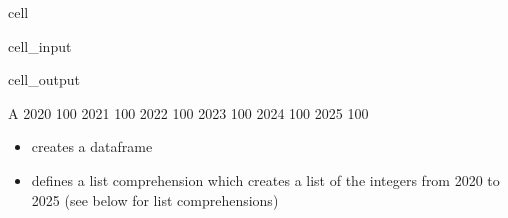 \documentclass[letterpaper,10pt,english]{jupyterBook}
\begin{document}
\begin{sphinxuseclass}{cell}\begin{sphinxVerbatimInput}

\begin{sphinxuseclass}{cell_input}
\begin{sphinxVerbatim}[commandchars=\\\{\}]
   
  
       \PYG{p}{[}    \PYG{p}{]} 
       \PYG{p}{[}\PYG{p}{]}                                 
\end{sphinxVerbatim}

\end{sphinxuseclass}\end{sphinxVerbatimInput}
\begin{sphinxVerbatimOutput}

\begin{sphinxuseclass}{cell_output}
\begin{sphinxVerbatim}[commandchars=\\\{\}]
        A
2020  100
2021  100
2022  100
2023  100
2024  100
2025  100
\end{sphinxVerbatim}

\end{sphinxuseclass}\end{sphinxVerbatimOutput}

\end{sphinxuseclass}\begin{itemize}
\item {} 
\sphinxAtStartPar
{} creates a dataframe  

\item {} 
\sphinxAtStartPar
{} defines a list comprehension which creates a list of the integers from 2020 to 2025 (see below for list comprehensions)

\end{itemize}
\end{document}
